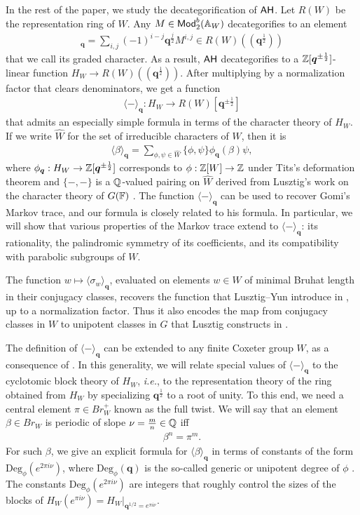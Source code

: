 \documentclass[a4paper,10pt,leqno]{amsart}
\theoremstyle{plain}
\theoremstyle{plain}
\theoremstyle{plain}
\theoremstyle{definition}
\theoremstyle{remark}
\newcommand{\Br}{\mathit{Br}}
\newcommand{\Mod}{\mathsf{Mod}}
\newcommand{\Q}{\bm{q}}
\newcommand{\UDeg}{\mathrm{Deg}}
\newcommand{\Tr}[1]{\langle{#1}\rangle_{\Q}}
\newcommand{\slope}{\nu}
\begin{document}
In the rest of the paper, we study the decategorification of $\sf{AH}$.
Let $R(W)$ be the representation ring of $W$.
Any $M \in \Mod_2^b(\bb{A}_W)$ decategorifies to an element
\begin{align}
[M]_{\Q} = \sum_{i,j} {(-1)^{i - j}}\Q^{\frac{j}{2}} M^{i, j} \in R(W)(\!(\Q^{\frac{1}{2}})\!)
\end{align}
that we call its graded character.
As a result, $\sf{AH}$ decategorifies to a $\bb{Z}[\Q^{\pm\frac{1}{2}}]$-linear function $H_W \to R(W)(\!(\Q^{\frac{1}{2}})\!)$.
After multiplying by a normalization factor that clears denominators, we get a function
\begin{align}
\Tr{-} : H_W \to R(W)[\Q^{\pm\frac{1}{2}}]
\end{align}
that admits an especially simple formula in terms of the character theory of $H_W$.
If we write $\hat{W}$ for the set of irreducible characters of $W$, then it is
\begin{align}
\Tr{\beta} = \sum_{\phi, \psi \in \hat{W}} {\{\phi, \psi\}}\phi_{\Q}(\beta)\psi,
\end{align}
where $\phi_{\Q} : H_W \to \bb{Z}[\Q^{\pm\frac{1}{2}}]$ corresponds to $\phi : \bb{Z}[W] \to \bb{Z}$ under Tits's deformation theorem and $\{-, -\}$ is a $\bb{Q}$-valued pairing on $\hat{W}$ derived from Lusztig's work on the character theory of $G(\bb{F})$ \cite{lusztig_1984}.
The function $\Tr{-}$ can be used to recover Gomi's Markov trace, and our formula is closely related to his formula.
In particular, we will show that various properties of the Markov trace extend to $\Tr{-}$: its rationality, the palindromic symmetry of its coefficients, and its compatibility with parabolic subgroups of $W$.

The function $w \mapsto \Tr{\sigma_w}$, evaluated on elements $w \in W$ of minimal Bruhat length in their conjugacy classes, recovers the function that Lusztig--Yun introduce in \cite{ly_2019}, up to a normalization factor.
Thus it also encodes the map from conjugacy classes in $W$ to unipotent classes in $G$ that Lusztig constructs in \cite{lusztig_2011}.

The definition of $\Tr{-}$ can be extended to any finite Coxeter group $W$, as a consequence of \cite{lusztig_1993, lusztig_1994, malle}.
In this generality, we will relate special values of $\Tr{-}$ to the cyclotomic block theory of $H_W$, \emph{i.e.}, to the representation theory of the ring obtained from $H_W$ by specializing $\Q^{\frac{1}{2}}$ to a root of unity.
To this end, we need a central element $\pi \in \Br_W^+$ known as the full twist.
We will say that an element $\beta \in \Br_W$ is periodic of slope $\slope = \frac{m}{n} \in \bb{Q}$ iff 
\begin{align}
\beta^n = \pi^m.
\end{align}
For such $\beta$, we give an explicit formula for $\Tr{\beta}$ in terms of constants of the form $\UDeg_\phi(e^{2\pi i\slope})$, where $\UDeg_\phi(\Q)$ is the so-called generic or unipotent degree of $\phi$ \cite[\S{8.1.8}]{gp}.
The constants $\UDeg_\phi(e^{2\pi i\slope})$ are integers that roughly control the sizes of the blocks of $H_W(e^{\pi i\slope}) = H_W|_{\Q^{1/2} = e^{\pi i\slope}}$.
\end{document}
